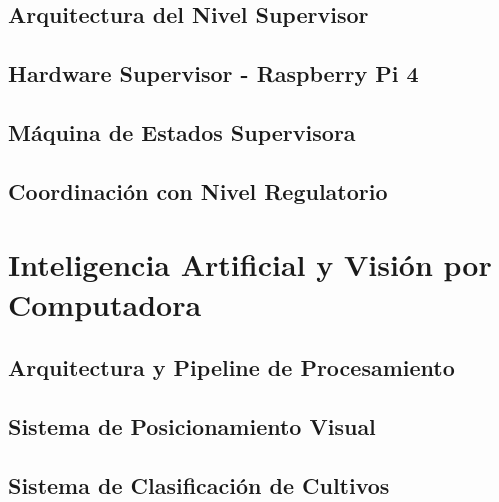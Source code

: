 \documentclass[a4paper,12pt]{report}
\begin{document}
\subsection{Arquitectura del Nivel Supervisor}


\subsection{Hardware Supervisor - Raspberry Pi 4}



\subsection{Máquina de Estados Supervisora}




\subsection{Coordinación con Nivel Regulatorio}




\section{Inteligencia Artificial y Visión por Computadora}

\subsection{Arquitectura y Pipeline de Procesamiento}
%
%

\subsection{Sistema de Posicionamiento Visual}
%
%

\subsection{Sistema de Clasificación de Cultivos}
%
%
\end{document}
